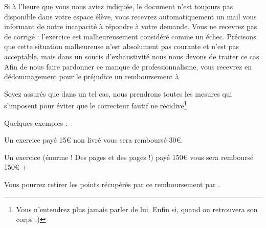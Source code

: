 ﻿Si à l'heure que vous nous aviez indiquée, le document n'est toujours pas disponible dans votre espace élève, vous recevrez automatiquement un mail vous informant de notre incapacité à répondre à votre demande. Vous ne recevrez \b{pas} de corrigé : l'exercice est malheureusement considéré comme un échec. Précisons que cette situation malheureuse n'est absolument pas courante et n'est pas acceptable, mais dans un soucis d'exhaustivité nous nous devons de traiter ce cas.
Afin de nous faire pardonner ce manque de professionnalisme, vous recevrez en dédommagement pour le préjudice un remboursement à %

Soyez assurés que dans un tel cas, nous prendrons toutes les mesures qui s'imposent pour éviter que le correcteur fautif ne récidive\footnote{Vous n'entendrez plus jamais parler de lui. Enfin si, quand on retrouvera son corps ;)}.

Quelques exemples :
\item Un exercice payé 15€ non livré vous sera remboursé 30€.
\item Un exercice (énorme ! Des pages et des pages !) payé 150€ vous sera remboursé 150€ + %

Vous pourrez retirer les points récupérés par ce remboursement par .
